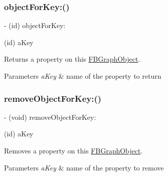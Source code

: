 \subsubsection{\texorpdfstring{object\+For\+Key\+:()}{objectForKey:()}\hspace{0.1cm}{\footnotesize\ttfamily [5/5]}}
{\footnotesize\ttfamily -\/ (id) object\+For\+Key\+: \begin{DoxyParamCaption}\item[{(id)}]{a\+Key }\end{DoxyParamCaption}}

Returns a property on this {\ttfamily \hyperlink{interfaceFBGraphObject}{F\+B\+Graph\+Object}}.


\begin{DoxyParams}{Parameters}
{\em a\+Key} & name of the property to return \\
\hline
\end{DoxyParams}
\mbox{\label{protocolFBGraphObject-p_ae70776266993262a70b438421f1e0209}} 
\subsubsection{\texorpdfstring{remove\+Object\+For\+Key\+:()}{removeObjectForKey:()}\hspace{0.1cm}{\footnotesize\ttfamily [1/5]}}
{\footnotesize\ttfamily -\/ (void) remove\+Object\+For\+Key\+: \begin{DoxyParamCaption}\item[{(id)}]{a\+Key }\end{DoxyParamCaption}}

Removes a property on this {\ttfamily \hyperlink{interfaceFBGraphObject}{F\+B\+Graph\+Object}}.


\begin{DoxyParams}{Parameters}
{\em a\+Key} & name of the property to remove \\
\hline
\end{DoxyParams}
\mbox{\label{protocolFBGraphObject-p_ae70776266993262a70b438421f1e0209}} 
